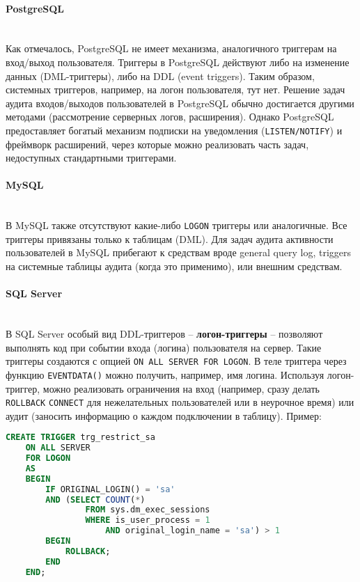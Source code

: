 \paragraph{\textbf{PostgreSQL}} ~\\
 Как отмечалось, PostgreSQL не имеет механизма, аналогичного триггерам на вход/выход пользователя. Триггеры в PostgreSQL действуют либо на изменение данных (DML-триггеры), либо на DDL (event triggers). Таким образом, системных триггеров, например, на логон пользователя, тут нет. Решение задач аудита входов/выходов пользователей в PostgreSQL обычно достигается другими методами (рассмотрение серверных логов, расширения). Однако PostgreSQL предоставляет богатый механизм подписки на уведомления (\texttt{LISTEN/NOTIFY}) и фреймворк расширений, через которые можно реализовать часть задач, недоступных стандартными триггерами.

\paragraph{\textbf{MySQL}} ~\\
 В MySQL также отсутствуют какие-либо \texttt{LOGON} триггеры или аналогичные. Все триггеры привязаны только к таблицам (DML). Для задач аудита активности пользователей в MySQL прибегают к средствам вроде general query log, triggers на системные таблицы аудита (когда это применимо), или внешним средствам.

\paragraph{\textbf{SQL Server}} ~\\ 
 В SQL Server особый вид DDL-триггеров – \textbf{логон-триггеры} – позволяют выполнять код при событии входа (логина) пользователя на сервер. Такие триггеры создаются с опцией \texttt{ON ALL SERVER FOR LOGON}. В теле триггера через функцию \texttt{EVENTDATA()} можно получить, например, имя логина. Используя логон-триггер, можно реализовать ограничения на вход (например, сразу делать \texttt{ROLLBACK} \texttt{CONNECT} для нежелательных пользователей или в неурочное время) или аудит (заносить информацию о каждом подключении в таблицу). 
 Пример:
 \begin{lstlisting}[language=SQL]
    CREATE TRIGGER trg_restrict_sa
    ON ALL SERVER
    FOR LOGON
    AS
    BEGIN
        IF ORIGINAL_LOGIN() = 'sa'
        AND (SELECT COUNT(*) 
                FROM sys.dm_exec_sessions
                WHERE is_user_process = 1
                    AND original_login_name = 'sa') > 1
        BEGIN
            ROLLBACK;
        END
    END;
\end{lstlisting}

